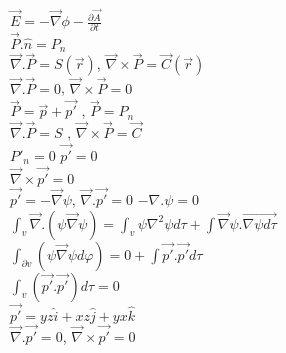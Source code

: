 \documentclass{report}
\begin{document}
$\vec{E}=-\vec{\nabla}\phi-\frac{\partial\vec{A}}{\partial t}$\\

$\vec{P}.\hat{n}=P_{n}$\\

$\vec{\nabla}.\vec{P}=S(\vec{r})$, \hspace{5mm} $\vec{\nabla}\times \vec{P}=\vec{C}(\vec{r})$\\

$\vec{\nabla}.\vec{P}=0$, $\vec{\nabla}\times \vec{P}=0$\\

$\vec{P}=\vec{p}+\vec{p'}$ \hspace{5mm}, $\vec{P}=P_{n}$\\

$\vec{\nabla}.\vec{P}=S$ \hspace{5mm}, $\vec{\nabla}\times
\vec{P}=\vec{C}$\\

$P'_{n}=0$ \hspace{5mm} $\vec{p'}=0$\\

$\vec{\nabla}\times
\vec{p'}=0$\\

$\vec{p'}=-\vec{\nabla}\psi$, \hspace{5mm} $\vec{\nabla}.\vec{p'}=0$ \hspace{5mm} $-\nabla.\psi=0$\\

$\int_{v}\vec{\nabla}.\left(\psi\vec{\nabla}\psi\right)=\int_{v}\psi\nabla^{2}\psi d \tau + \int \vec{\nabla} \psi . \vec{\nabla\psi d \tau}$\\

$\int_{\partial v}\left(\psi\vec{\nabla}\psi d \varphi\right) =0 + \int \vec{p'}.\vec{p'}d \tau$\\

$\int_{v}(\vec{p'}.\vec{p'})d \tau=0$\\



$\vec{p'}=yz \hat{i}+ xz \hat{j}+yx\hat{k}$\\

$\vec{\nabla}.\vec{p'}=0$, $\vec{\nabla}\times
\vec{p'}=0$
\end{document}
